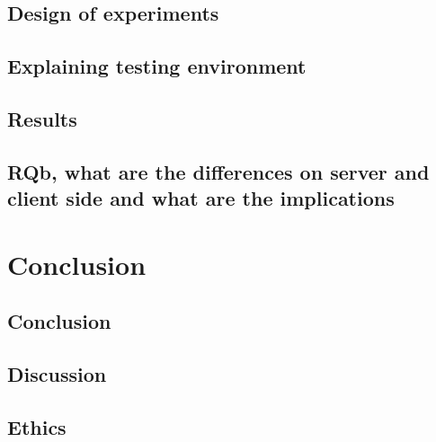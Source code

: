 \documentclass[twoside]{Style/uva-inf-bachelor-thesis}
\begin{document}
\section{Design of experiments}
\section{Explaining testing environment}
\section{Results}
\section{RQb, what are the differences on server and client side and what are the implications}

\chapter{Conclusion}
\section{Conclusion}
\section{Discussion}
\section{Ethics}
\end{document}
